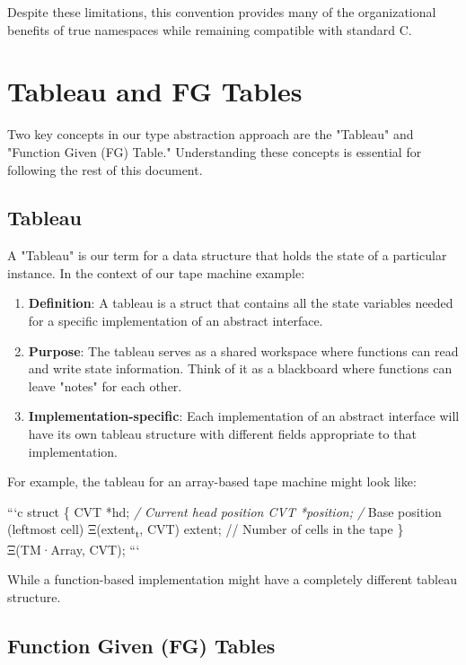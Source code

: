 \documentclass[11pt]{article}
\begin{document}
Despite these limitations, this convention provides many of the organizational benefits of true namespaces while remaining compatible with standard C.

\section{Tableau and FG Tables}
\label{sec:org8b1de5b}

Two key concepts in our type abstraction approach are the "Tableau" and "Function Given (FG) Table." Understanding these concepts is essential for following the rest of this document.

\subsection{Tableau}
\label{sec:orgdef1786}

A "Tableau" is our term for a data structure that holds the state of a particular instance. In the context of our tape machine example:

\begin{enumerate}
\item \textbf{\textbf{Definition}}: A tableau is a struct that contains all the state variables needed for a specific implementation of an abstract interface.

\item \textbf{\textbf{Purpose}}: The tableau serves as a shared workspace where functions can read and write state information. Think of it as a blackboard where functions can leave "notes" for each other.

\item \textbf{\textbf{Implementation-specific}}: Each implementation of an abstract interface will have its own tableau structure with different fields appropriate to that implementation.
\end{enumerate}

For example, the tableau for an array-based tape machine might look like:

```c
struct \{
  CVT *hd;           \emph{/ Current head position
  CVT *position;     /} Base position (leftmost cell)
  Ξ(extent\textsubscript{t}, CVT) extent;  // Number of cells in the tape
\} Ξ(TM·Array, CVT);
```

While a function-based implementation might have a completely different tableau structure.

\subsection{Function Given (FG) Tables}
\label{sec:orgdfb6392}
\end{document}
